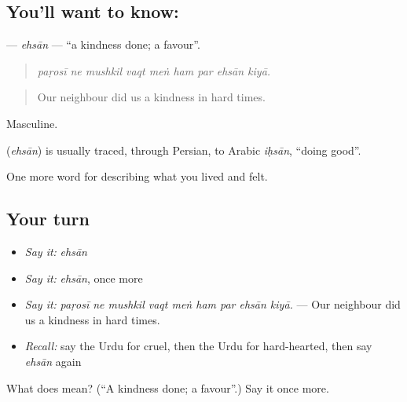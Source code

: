\subsection*{You'll want to know: }
\textbf{} — \emph{ehsān} — \textquotedblleft{}a kindness done; a favour\textquotedblright{}.

\begin{quote}
        
\end{quote}

\begin{quote}
\emph{paṛosī ne mushkil vaqt meṅ ham par ehsān kiyā.}
\end{quote}

\begin{quote}
Our neighbour did us a kindness in hard times.
\end{quote}

Masculine.

\begin{cousinweb}
\textbf{} (\emph{ehsān}) is usually traced, through Persian, to Arabic \emph{iḥsān}, \textquotedblleft{}doing good\textquotedblright{}.
\end{cousinweb}

\begin{grammarlens}[title={What you've built}]
One more word for describing what you lived and felt.
\end{grammarlens}

\subsection*{Your turn}
\begin{itemize}
\raggedright
  \item \emph{Say it:} \emph{ehsān}
  \item \emph{Say it:} \emph{ehsān}, once more
  \item \emph{Say it:} \emph{paṛosī ne mushkil vaqt meṅ ham par ehsān kiyā.} — Our neighbour did us a kindness in hard times.
  \item \emph{Recall:} say the Urdu for cruel, then the Urdu for hard-hearted, then say \emph{ehsān} again
\end{itemize}

\begin{tcolorbox}[breakable,colback=teal!4,colframe=teal!35!black,title={Before you move on}]
What does  mean? (\textquotedblleft{}A kindness done; a favour\textquotedblright{}.) Say it once more.
\end{tcolorbox}
